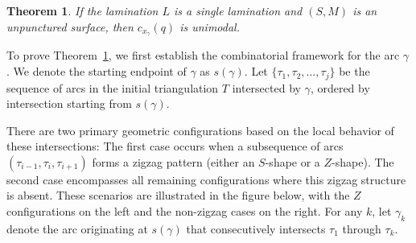 \documentclass{article}
\newtheorem{theorem}{Theorem}
\theoremstyle{remark}
\begin{document}
\begin{theorem}\label{thm:uni_single}
     If the lamination $L$ is a single lamination and $(S,M)$ is an unpunctured surface, then $c_{x_\gamma}(q)$ is unimodal.
\end{theorem}

To prove Theorem~\ref{thm:uni_single}, we first establish the combinatorial framework for the arc $\gamma$. We denote the starting endpoint of $\gamma$ as $s(\gamma)$. Let $\{\tau_1, \tau_2, \dots, \tau_j\}$ be the sequence of arcs in the initial triangulation $T$ intersected by $\gamma$, ordered by intersection starting from $s(\gamma)$. 

There are two primary geometric configurations based on the local behavior of these intersections: The first case occurs when a subsequence of arcs $(\tau_{i-1}, \tau_i, \tau_{i+1})$ forms a zigzag pattern (either an $S$-shape or a $Z$-shape). The second case encompasses all remaining configurations where this zigzag structure is absent. These scenarios are illustrated in the figure below, with the $Z$ configurations on the left and the non-zigzag cases on the right. For any $k$, let $\gamma_k$ denote the arc originating at $s(\gamma)$ that consecutively intersects $\tau_1$ through $\tau_k$.
\end{document}
